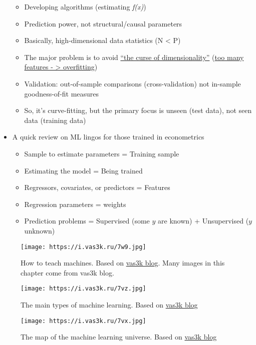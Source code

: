 \documentclass[
]{book}
\begin{document}
\begin{itemize}
  \begin{itemize}
  \item
    Developing algorithms (estimating \emph{f(x)})
  \item
    Prediction power, not structural/causal parameters
  \item
    Basically, high-dimensional data statistics (N \textless{} P)
  \item
    The major problem is to avoid \href{https://en.wikipedia.org/wiki/Curse_of_dimensionality}{``the curse of dimensionality''} (\href{https://towardsdatascience.com/the-curse-of-dimensionality-50dc6e49aa1e}{too many features - \textgreater{} overfitting})
  \item
    Validation: out-of-sample comparisons (cross-validation) not in-sample goodness-of-fit measures
  \item
    So, it's curve-fitting, but the primary focus is unseen (test data), not seen data (training data)
  \end{itemize}
\item
  A quick review on ML lingos for those trained in econometrics

  \begin{itemize}
  \item
    Sample to estimate parameters = Training sample
  \item
    Estimating the model = Being trained
  \item
    Regressors, covariates, or predictors = Features
  \item
    Regression parameters = weights
  \item
    Prediction problems = Supervised (some \(y\) are known) + Unsupervised (\(y\) unknown)
  \end{itemize}
\end{itemize}

\begin{figure}
\centering
\texttt{[image: https://i.vas3k.ru/7w9.jpg]}
\caption{How to teach machines. Based on \href{https://vas3k.com/blog/machine_learning/}{vas3k blog}. Many images in this chapter come from vas3k blog.}
\end{figure}

\begin{figure}
\centering
\texttt{[image: https://i.vas3k.ru/7vz.jpg]}
\caption{The main types of machine learning. Based on \href{https://vas3k.com/blog/machine_learning/}{vas3k blog}}
\end{figure}

\begin{figure}
\centering
\texttt{[image: https://i.vas3k.ru/7vx.jpg]}
\caption{The map of the machine learning universe. Based on \href{https://vas3k.com/blog/machine_learning/}{vas3k blog}}
\end{figure}
\end{document}

